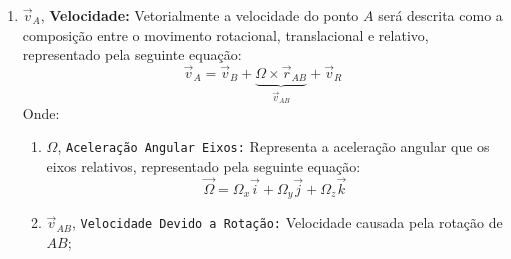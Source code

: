 \documentclass{article}
\begin{document}
\begin{enumerate}[rightmargin = \leftmargin, noitemsep]
                    \item $\vec{v}_{A}$, \textbf{Velocidade:} Vetorialmente a velocidade do ponto $A$ será descrita como a composição entre o movimento rotacional,  translacional e relativo, representado pela seguinte equação:
                        \begin{equation}
                            \boxed{
                                \vec{v}_{A} = 
                                \vec{v}_{B} + 
                                \underbrace{
                                    \Omega\times\vec{r}_{AB}
                                }_{\vec{v}_{AB}} + 
                                \vec{v}_{R}
                            }
                        \end{equation}
                    Onde:
                        \begin{enumerate}[rightmargin = \leftmargin, noitemsep]
                            \item $\Omega$, \texttt{Aceleração Angular Eixos:} Representa a aceleração angular que os eixos relativos, representado pela seguinte equação:
                                \begin{equation}
                                    \boxed{
                                        \vec{\Omega} = 
                                        \Omega_{x}\vec{i} + 
                                        \Omega_{y}\vec{j} + 
                                        \Omega_{z}\vec{k}
                                    }
                                \end{equation}

                            \item $\vec{v}_{AB}$, \texttt{Velocidade Devido a Rotação:} Velocidade causada pela rotação de $AB$;


\end{enumerate}
\end{enumerate}
\end{document}
